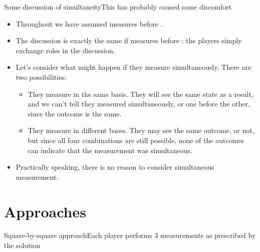 \begin{frame}{Some discussion of simultaneity}{This has probably caused some discomfort}

\begin{itemize}[<+->]
    \item Throughout we have assumed  measures before .
    \item The discussion is exactly the same if  measures before :  the players simply exchange roles in the discussion.
    \item Let's consider what might happen if they measure simultaneously.  There are two possibilities:
    \begin{itemize}
        \item They measure in the same basis.  They will see the same state as a result, and we can't tell they measured simultaneously, or one before the other, since the outcome is the same.
        \item They measure in different bases.  They may see the same outcome, or not, but since all four combinations are still possible, none of the outcomes can indicate that the measurement was simultaneous.
    \end{itemize}
    \item Practically speaking, there is no reason to consider simultaneous measurement.
\end{itemize}
    
\end{frame}



\section*{Approaches}

\begin{frame}{Square-by-square approach}{Each player performs 3 measurements as prescribed by the solution}
\begin{MPScene}

    
\end{MPScene}
\end{frame}

